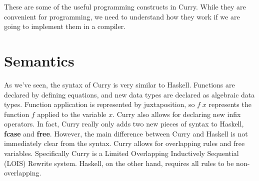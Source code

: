 \documentclass{book}
\theoremstyle{definition}
\newcommand{\Varid}[1]{\mathit{#1}}
\begin{document}
These are some of the useful programming constructs in Curry.
While they are convenient for programming, we need to understand how they work
if we are going to implement them in a compiler.

\section{Semantics}

As we've seen, the syntax of Curry is very similar to Haskell.
Functions are declared by defining equations, and new data types are declared as algebraic data types.
Function application is represented by juxtaposition,
so \ensuremath{\Varid{f}\;\Varid{x}} represents the function \ensuremath{\Varid{f}} applied to the variable \ensuremath{\Varid{x}}.
Curry also allows for declaring new infix operators.
In fact, Curry really only adds two new pieces of syntax to Haskell, \textbf{fcase} and \textbf{free}.
However, the main difference between Curry and Haskell is not immediately clear from the syntax.
Curry allows for overlapping rules and free variables.
Specifically Curry is a Limited Overlapping Inductively Sequential (LOIS) Rewrite system.
Haskell, on the other hand, requires all rules to be non-overlapping.
\end{document}
